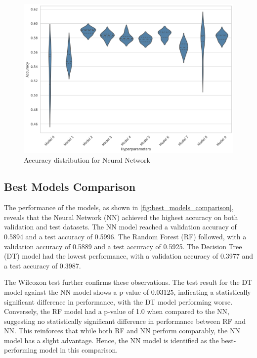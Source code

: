 \begin{figure}[H]
    \centering
    \includegraphics[width=0.99\columnwidth]{images/violin_plot_neural_network.png}
    \caption{Accuracy distribution for Neural Network}
    \label{fig:nn_violin_plot}
\end{figure}



\subsection{Best Models Comparison}
The performance of the models, as shown in \autoref{fig:best_models_comparison}, 
reveals that the Neural Network (NN) achieved 
the highest accuracy on both validation and test 
datasets. The NN model reached a validation 
accuracy of 0.5894 and a test accuracy of 0.5996. 
The Random Forest (RF) followed, with a validation 
accuracy of 0.5889 and a test accuracy of 0.5925. 
The Decision Tree (DT) model had the lowest 
performance, with a validation accuracy of 0.3977 
and a test accuracy of 0.3987.

The Wilcoxon test further confirms these observations. 
The test result for the DT model against the NN model 
shows a p-value of 0.03125, indicating a statistically 
significant difference in performance, with the 
DT model performing worse. Conversely, the RF model 
had a p-value of 1.0 when compared to the NN, 
suggesting no statistically significant difference 
in performance between RF and NN. This reinforces 
that while both RF and NN perform comparably, the 
NN model has a slight advantage. Hence, the NN model 
is identified as the best-performing model in this 
comparison.

